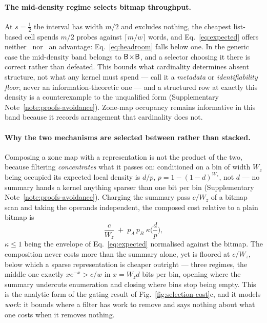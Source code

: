 \paragraph*{The mid-density regime selects bitmap throughput.}
At $s=\tfrac12$ the interval has width $m/2$ and excludes nothing, the cheapest list-based cell spends
$m/2$ probes against $\lceil m/w\rceil$ words, and Eq.~\eqref{eq:expected} offers neither \rR\ nor \rW\
an advantage: Eq.~\eqref{eq:headroom} falls below one. In the generic case the mid-density band belongs
to $\textsf{B}\!\times\!\textsf{B}$, and a selector choosing it there is correct rather than defeated. This bounds what
cardinality determines absent structure, not what any kernel must spend --- call it a \emph{metadata}
or \emph{identifiability floor}, never an information-theoretic one --- and a structured row at exactly
this density is a counterexample to the unqualified form (Supplementary Note~\ref{note:proofs-avoidance}).
Zone-map occupancy remains informative in this band because it records arrangement that cardinality
does not.

\paragraph*{Why the two mechanisms are selected between rather than stacked.}
Composing a zone map with a representation is not the product of the two, because filtering
\emph{concentrates} what it passes on: conditioned on a bin of width $W_z$ being occupied its expected
local density is $d/p$, $p=1-(1-d)^{W_z}$, not $d$ --- no summary hands a kernel anything sparser than
one bit per bin (Supplementary Note~\ref{note:proofs-avoidance}). Charging the summary pass $c/W_z$ of a bitmap scan and taking
the operands independent, the composed cost relative to a plain bitmap is
\begin{equation}
\frac{c}{W_z} \;+\; p_A\,p_B\;\kappa\!\Big(\frac{d}{p}\Big),
\label{eq:compose}
\end{equation}
$\kappa\le1$ being the envelope of Eq.~\eqref{eq:expected} normalised against the bitmap. The
composition never costs more than the summary alone, yet is floored at $c/W_z$, below which a sparse
representation is cheaper outright --- three regimes, the middle one exactly $x e^{-x} > c/w$ in
$x = W_z d$ bits per bin, opening where the summary undercuts enumeration and closing where bins stop
being empty. This is the analytic form of the gating result of Fig.~\ref{fig:selection-cost}c, and it
models \emph{work}: it bounds where a filter has work to remove and says nothing about what one costs
when it removes nothing.

